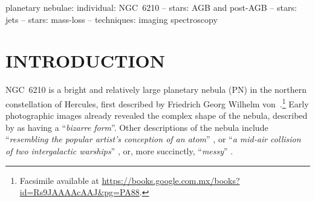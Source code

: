\documentclass[useAMS, usenatbib]{mnras}
\begin{document}
\begin{abstract}
\end{abstract}


\begin{keywords}
  planetary nebulae: individual: NGC~6210
  -- stars: AGB and post-AGB
  -- stars: jets
  -- stars: mass-loss
  -- techniques: imaging spectroscopy
\end{keywords}

\maketitle

\section{INTRODUCTION}
\label{sec:introduction}
NGC~6210 is a bright and relatively large planetary nebula (PN) in the northern constellation of Hercules, first described by Friedrich Georg Wilhelm von~\citet{Struve:1827a}.\footnote{
  Facsimile available at \url{https://books.google.com.mx/books?id=Rs9JAAAAcAAJ&pg=PA88}.
}
Early photographic images \citep{Curtis:1918a, Duncan:1937a} already revealed the complex shape of the nebula, described by \citeauthor{Duncan:1937a} as having a ``\textit{bizarre form}''.
Other descriptions of the nebula include ``\textit{resembling the popular artist's conception of an atom}'' \citep{Feibelman:1971a},
or ``\textit{a mid-air collision of two intergalactic warships}'' \citep{OMeara:2007a},
or, more succinctly, ``\textit{messy}'' \citep{Soker:2004b}.
\end{document}
